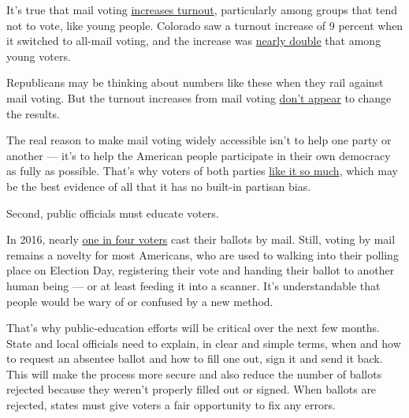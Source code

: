 It's true that mail voting
\href{https://www.vox.com/policy-and-politics/2018/5/23/17383400/vote-by-mail-home-california-alaska-nebraska}{increases
turnout}, particularly among groups that tend not to vote, like young
people. Colorado saw a turnout increase of 9 percent when it switched to
all-mail voting, and the increase was
\href{https://www.nytimes3xbfgragh.onion/2020/05/04/opinion/coronavirus-vote-by-mail.html}{nearly
double} that among young voters.

Republicans may be thinking about numbers like these when they rail
against mail voting. But the turnout increases from mail voting
\href{https://www.nytimes3xbfgragh.onion/2020/04/10/us/politics/vote-by-mail.html}{don't
appear} to change the results.

The real reason to make mail voting widely accessible isn't to help one
party or another --- it's to help the American people participate in
their own democracy as fully as possible. That's why voters of both
parties
\href{https://news.gallup.com/poll/310586/americans-favor-voting-mail-option-november.aspx}{like
it so much}, which may be the best evidence of all that it has no
built-in partisan bias.

Second, public officials must educate voters.

In 2016, nearly
\href{https://www.eac.gov/documents/2017/10/17/eavs-deep-dive-early-absentee-and-mail-voting-data-statutory-overview}{one
in four voters} cast their ballots by mail. Still, voting by mail
remains a novelty for most Americans, who are used to walking into their
polling place on Election Day, registering their vote and handing their
ballot to another human being --- or at least feeding it into a scanner.
It's understandable that people would be wary of or confused by a new
method.

That's why public-education efforts will be critical over the next few
months. State and local officials need to explain, in clear and simple
terms, when and how to request an absentee ballot and how to fill one
out, sign it and send it back. This will make the process more secure
and also reduce the number of ballots rejected because they weren't
properly filled out or signed. When ballots are rejected, states must
give voters a fair opportunity to fix any errors.

